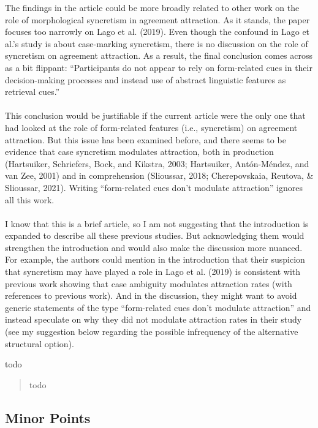 \documentclass{ar2rc}
\begin{document}
\RC The findings in the article could be more broadly related to other work on the role of morphological syncretism in agreement attraction. As it stands, the paper focuses too narrowly on Lago et al. (2019). Even though the confound in Lago et al.’s study is about case-marking syncretism, there is no discussion on the role of syncretism on agreement attraction. As a result, the final conclusion comes across as a bit flippant: ``Participants do not appear to rely on form-related cues in their decision-making processes and instead use of abstract linguistic features as retrieval cues.''\\\\
This conclusion would be justifiable if the current article were the only one that had looked at the role of form-related features (i.e., syncretism) on agreement attraction. But this issue has been examined before, and there seems to be evidence that case syncretism modulates attraction, both in production (Hartsuiker, Schriefers, Bock, and Kikstra, 2003; Hartsuiker, Antón-Méndez, and van Zee, 2001) and in comprehension (Slioussar, 2018; Cherepovskaia, Reutova, \& Slioussar, 2021). Writing ``form-related cues don’t modulate attraction'' ignores all this work.\\\\
I know that this is a brief article, so I am not suggesting that the introduction is expanded to describe all these previous studies. But acknowledging them would strengthen the introduction and would also make the discussion more nuanced. For example, the authors could mention in the introduction that their suspicion that syncretism may have played a role in Lago et al. (2019) is consistent with previous work showing that case ambiguity modulates attraction rates (with references to previous work). And in the discussion, they might want to avoid generic statements of the type ``form-related cues don’t modulate attraction'' and instead speculate on why they did not modulate attraction rates in their study (see my suggestion below regarding the possible infrequency of the alternative structural option).

\AC todo

\begin{quote}
    todo 
\end{quote}

\subsection{Minor Points}
\end{document}
